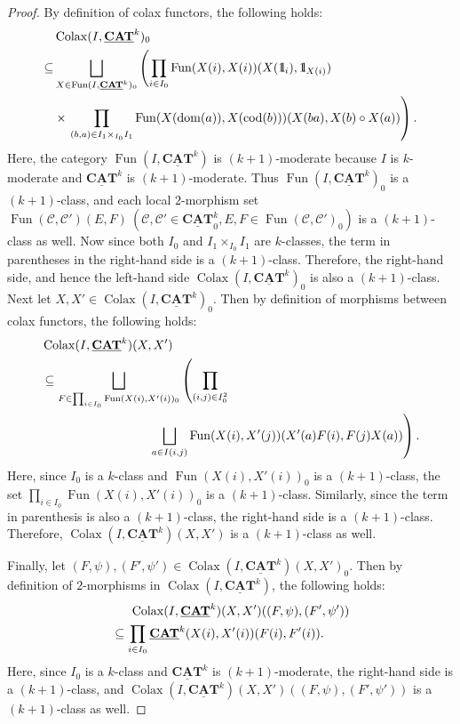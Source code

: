 \documentclass{surv-l}
\numberwithin{equation}{chapter}
\numberwithin{figure}{chapter}
\theoremstyle{plain}
\theoremstyle{definition}
\theoremstyle{remark}
\newcommand{\id}{1\kern-.25em{\text{{\rm l}}}}
\DeclareMathOperator{\Fun}{Fun}
\DeclareMathOperator{\Colax}{Colax}
\DeclareMathOperator{\dom}{dom}
\DeclareMathOperator{\cod}{cod}
\begin{document}
\begin{proof}
By definition of colax functors, the following holds:
\[
\begin{aligned}
&\Colax(I, \underline{\mathbf{CAT}}^k)_0\\
\subseteq&
\bigsqcup_{X \in \Fun(I, \underline{\mathbf{CAT}}^k)_0}
\left(\prod_{i\in I_0}\Fun(X(i), X(i))(X(\id_i), \id_{X(i)})\right.\\
&\times
\left.\prod_{(b,a)\in I_1\times_{I_0}I_1}\Fun(X(\dom(a)), X(\cod(b)))(X(ba), X(b)\circ X(a))
\right).
\end{aligned}
\]
Here, the category $\Fun(I, \underline{\mathbf{CAT}}^k)$ is $(k+1)$-moderate because
$I$ is $k$-moderate and $\underline{\mathbf{CAT}}^k$ is $(k+1)$-moderate.
Thus $\Fun(I, \underline{\mathbf{CAT}}^k)_0$ is a $(k+1)$-class, and each local $2$-morphism set
$\Fun({\mathcal{C}}, {\mathcal{C}}')(E, F)\ ({\mathcal{C}}, {\mathcal{C}}' \in \underline{\mathbf{CAT}}^k_0, E, F \in \Fun({\mathcal{C}}, {\mathcal{C}}')_0)$
is a $(k+1)$-class as well.
Now since both $I_0$ and $I_1\times_{I_0}I_1$ are $k$-classes,
the term in parentheses in the right-hand side is a $(k+1)$-class.
Therefore, the right-hand side, and hence the left-hand side
$\Colax(I, \underline{\mathbf{CAT}}^k)_0$ is also a $(k+1)$-class.
Next let $X, X' \in \Colax(I, \underline{\mathbf{CAT}}^k)_0$.
Then by definition of morphisms between colax functors,
the following holds:
\[
\begin{aligned}
&\Colax(I, \underline{\mathbf{CAT}}^k)(X, X')\\
& \subseteq
\bigsqcup_{F \in \prod_{i\in I_0}\Fun(X(i),X'(i))_0}\left(\prod_{(i,j)\in I_0^2}\right.\\
&\hspace{20ex}\left.\bigsqcup_{a \in I(i,j)}\Fun(X(i), X'(j))(X'(a)F(i), F(j)X(a))\right).
\end{aligned}
\]
Here, since $I_0$ is a $k$-class and $\Fun(X(i),X'(i))_0$ is a $(k+1)$-class,
the set \linebreak[4] $\prod_{i\in I_0}\Fun(X(i),X'(i))_0$ is a $(k+1)$-class.
Similarly, since the term in parenthesis is also a $(k+1)$-class,
the right-hand side is a $(k+1)$-class.
Therefore, $\Colax(I, \underline{\mathbf{CAT}}^k)(X, X')$ is a $(k+1)$-class as well.

Finally, let $(F,\psi), (F',\psi') \in \Colax(I, \underline{\mathbf{CAT}}^k)(X, X')_0$.
Then by definition of $2$-morphisms in $\Colax(I, \underline{\mathbf{CAT}}^k)$,
the following holds:
\[
\begin{aligned}
&\hspace{1.5em}\Colax(I, \underline{\mathbf{CAT}}^k)(X, X')((F,\psi),(F',\psi'))\\
&\subseteq
\prod_{i\in I_0}\underline{\mathbf{CAT}}^k(X(i), X'(i))(F(i),F'(i)).
\end{aligned}
\]
Here, since $I_0$ is a $k$-class and $\underline{\mathbf{CAT}}^k$ is $(k+1)$-moderate,
the right-hand side is a $(k+1)$-class, and
$\Colax(I, \underline{\mathbf{CAT}}^k)(X, X')((F,\psi),(F',\psi'))$ is a $(k+1)$-class as well.
\end{proof}
\end{document}
